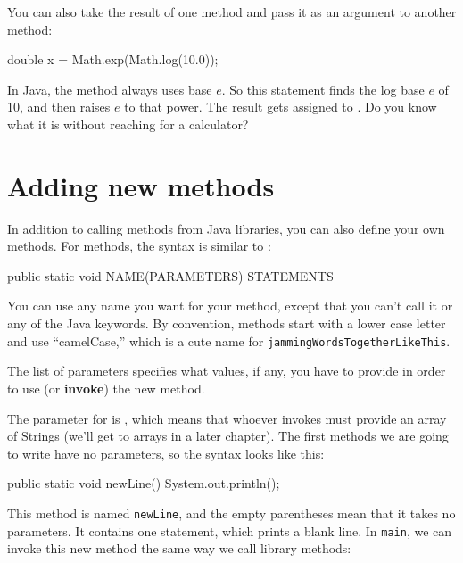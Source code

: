 You can also take the result of one method and pass it as an argument to another method:

\begin{code}
    double x = Math.exp(Math.log(10.0));
\end{code}

In Java, the  method always uses base $e$.
So this statement finds the log base $e$ of 10, and then raises $e$ to that power.
The result gets assigned to .
Do you know what it is without reaching for a calculator?

\section{Adding new methods}
\label{adding_methods}


In addition to calling methods from Java libraries, you can also define your own methods.
For  methods, the syntax is similar to :

\begin{code}
    public static void NAME(PARAMETERS) {
        STATEMENTS
    }
\end{code}

You can use any name you want for your method, except that you can't call it  or any of the Java keywords.
By convention, methods start with a lower case letter and use ``camelCase,'' which is a cute name for {\tt jammingWordsTogetherLikeThis}.


The list of parameters specifies what values, if any, you have to provide in order to use (or {\bf invoke}) the new method.

The parameter for  is , which means that whoever invokes  must provide an array of Strings (we'll get to arrays in a later chapter).
The first methods we are going to write have no parameters, so the syntax looks like this:

\begin{code}
    public static void newLine() {
        System.out.println();
    }
\end{code}

This method is named {\tt newLine}, and the empty parentheses mean that it takes no parameters.
It contains one statement, which prints a blank line.
In {\tt main}, we can invoke this new method the same way we call library methods:

